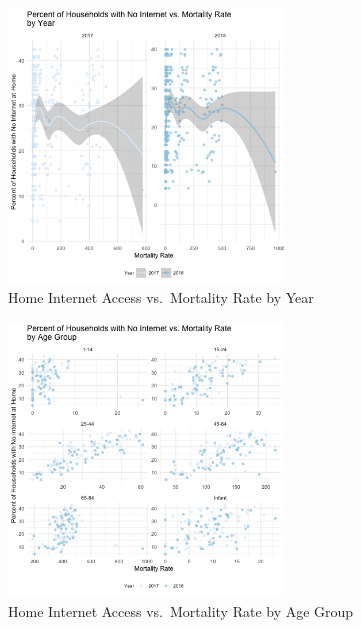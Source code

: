 \documentclass[
  letterpaper,
  DIV=11,
  numbers=noendperiod]{scrartcl}
\begin{document}
\begin{figure}

{\centering \includegraphics[width=0.65\textwidth,height=\textheight]{figures/nohhint_vs_mortality_by_year.png}

}

\caption{\label{fig-5}Home Internet Access vs.~Mortality Rate by Year}

\end{figure}

\begin{figure}

{\centering \includegraphics[width=0.65\textwidth,height=\textheight]{figures/nohhint_vs_mortality_by_age.png}

}

\caption{\label{fig-6}Home Internet Access vs.~Mortality Rate by Age
Group}

\end{figure}
\end{document}
